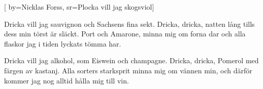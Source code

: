 
[
  by={Nicklas Forss},
  sr={Plocka vill jag skogsviol}]

\beginverse*
Dricka vill jag sauvignon 
och Sachsens fina sekt.
Dricka, dricka, natten lång 
tills dess min törst är släckt.
Port och Amarone, minna mig om forna dar
och alla flaskor jag i tiden 
lyckats tömma har.
\endverse

\beginverse*
Dricka vill jag alkohol,
som Eiswein och champagne.
Dricka, dricka, Pomerol 
med färgen av kastanj.
Alla sorters starksprit 
minna mig om vännen min,
och därför kommer jag nog alltid
hålla mig till vin.
\endverse
\endsong